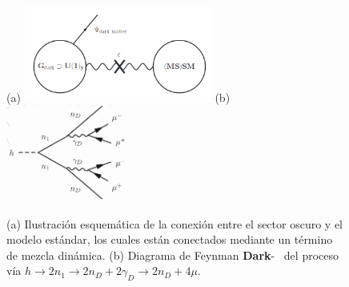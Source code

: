 \begin{figure}[!t]
    \centering
    (a)
    \includegraphics[width=0.55\textwidth]{Fisica_de_Particulas/imagenes/sketch_darksector.png}
    (b)
    \includegraphics[width=0.35\textwidth]{Fisica_de_Particulas/imagenes/darksusy_feynman.png}
    \caption{(a) Ilustración esquemática de la conexión entre el sector oscuro y el modelo estándar, los cuales están conectados mediante un término de mezcla dinámica. (b) Diagrama de Feynman \textbf{Dark}-\SUSY ~ del proceso vía $h \rightarrow 2n_1 \rightarrow 2n_D + 2\gamma_D \rightarrow 2n_D + 4\mu$.}
    \label{fig:sketch_darksector}
\end{figure}

